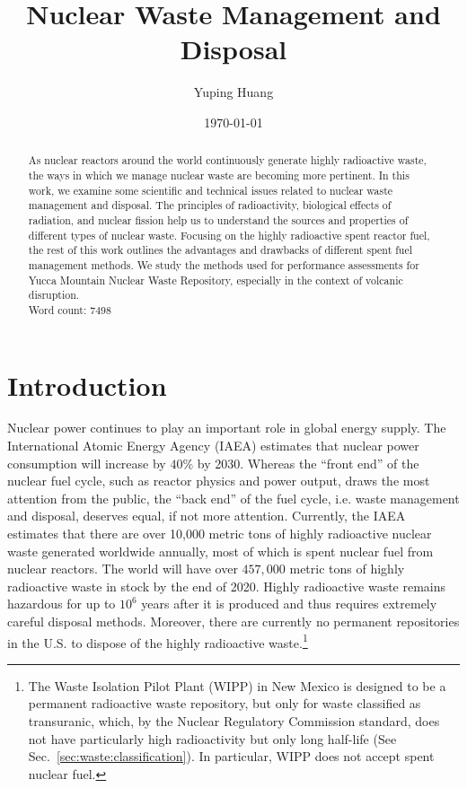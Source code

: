 \documentclass[nofootinbib,preprint,aps]{revtex4-1}
\begin{document}
\title{Nuclear Waste Management and Disposal}

\author{Yuping Huang}%

\date{\today}%
\begin{abstract}
    As nuclear reactors around the world continuously generate highly radioactive waste,
    the ways in which we manage nuclear waste are becoming more pertinent. In this work,
    we examine some scientific and technical issues related to nuclear waste management and disposal.
    The principles of radioactivity, biological effects of radiation, and nuclear fission help us to understand the sources and properties
    of different types of nuclear waste. Focusing on the highly radioactive spent reactor fuel, the rest
    of this work outlines the advantages and drawbacks of different spent fuel management
    methods. We study the methods used for performance assessments for Yucca Mountain Nuclear Waste Repository,
    especially in the context of volcanic disruption.\\
    Word count: 7498
\end{abstract}
\maketitle
\tableofcontents
\newpage
\section{Introduction}
Nuclear power continues to play an important role in global energy supply.
The International Atomic Energy Agency (IAEA) estimates that nuclear power
consumption will increase by $40\%$ by 2030.\cite{iaea12}
Whereas the ``front end'' of the nuclear fuel cycle, such as reactor physics and power output, draws
the most attention from the public, the ``back end'' of the fuel cycle, i.e. waste management and
disposal, deserves equal, if not more attention.
Currently, the IAEA estimates that there are over 10,000 metric tons of highly radioactive nuclear waste 
generated worldwide annually,
most of which is spent nuclear fuel from nuclear reactors.\cite{iaea08, r12}
The world will have over $457,000$ metric tons of highly radioactive waste in stock by the end of 2020.\cite{r12}
Highly radioactive waste remains hazardous for up to $10^6$ years after it is produced and thus
requires extremely careful disposal methods.
Moreover, there are currently no permanent repositories in the U.S. to dispose of the highly radioactive
waste.\footnote{The Waste Isolation Pilot Plant (WIPP) in New Mexico is designed to be a permanent radioactive
    waste repository, but only
for waste classified as transuranic, which, by the Nuclear Regulatory Commission standard, does not have particularly
high radioactivity but only long half-life (See Sec.~\ref{sec:waste:classification}). In particular, WIPP does not accept spent nuclear fuel.\cite[chapt. 4]{aa12}}  
\end{document}
